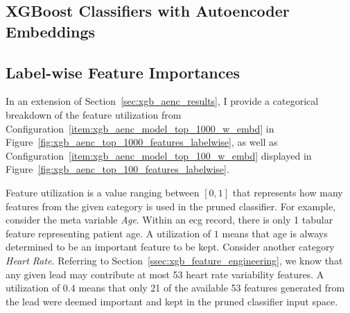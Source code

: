 \documentclass[\main/thesis.tex]{subfiles}
\begin{document}
\begin{appendices}
\chapter{XGBoost Classifiers with Autoencoder Embeddings}
\section{Label-wise Feature Importances}

In an extension of Section~\ref{sec:xgb_aenc_results}, I provide a categorical breakdown of the feature utilization from Configuration~\ref{item:xgb_aenc_model_top_1000_w_embd} in Figure~\ref{fig:xgb_aenc_top_1000_features_labelwise}, as well as Configuration~\ref{item:xgb_aenc_model_top_100_w_embd} displayed in Figure~\ref{fig:xgb_aenc_top_100_features_labelwise}.

Feature utilization is a value ranging between $[0, 1]$ that represents how many features from the given category is used in the pruned classifier.
For example, consider the meta variable \emph{Age}.
Within an \gls{ecg} record, there is only 1 tabular feature representing patient age.
A utilization of $1$ means that age is always determined to be an important feature to be kept.
Consider another category \emph{Heart Rate}.
Referring to Section~\ref{ssec:xgb_feature_engineering}, we know that any given lead may contribute at most 53 heart rate variability features.
A utilization of $0.4$ means that only 21 of the available 53 features generated from the lead were deemed important and kept in the pruned classifier input space.


\end{appendices}
\end{document}
